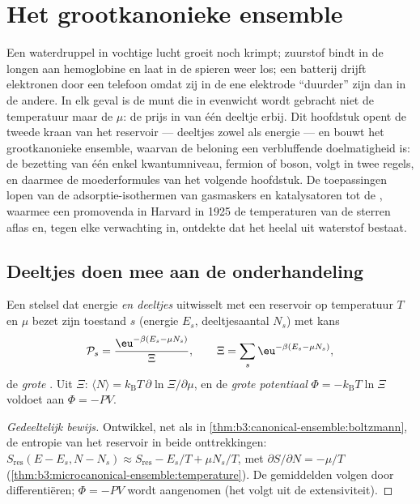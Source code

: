 \chapter{Het grootkanonieke ensemble}\label{ch:b3:grand-canonical}

Een waterdruppel in vochtige lucht groeit noch krimpt; zuurstof bindt in
de longen aan hemoglobine en laat in de spieren weer los; een batterij
drijft elektronen door een telefoon omdat zij in de ene elektrode
``duurder'' zijn dan in de andere. In elk geval is de munt die in
evenwicht wordt gebracht niet de temperatuur maar de \emph{} $\mu$: de prijs in  van één deeltje erbij. Dit
hoofdstuk opent de tweede kraan van het reservoir --- deeltjes zowel als
energie --- en bouwt het grootkanonieke ensemble, waarvan de beloning een
verbluffende doelmatigheid is: de bezetting van één enkel kwantumniveau,
fermion of boson, volgt in twee regels, en daarmee de moederformules van
het volgende hoofdstuk. De toepassingen lopen van de
adsorptie-isothermen van gasmaskers en katalysatoren tot de , waarmee een promovenda in Harvard in 1925 de temperaturen van
de sterren aflas en, tegen elke verwachting in, ontdekte dat het heelal
uit waterstof bestaat.

\section{Deeltjes doen mee aan de onderhandeling}

\begin{theorem}\label{thm:b3:grand-canonical:distribution}
Een stelsel dat energie \emph{en deeltjes} uitwisselt met een reservoir op
temperatuur $T$ en  $\mu$ bezet zijn toestand $s$
(energie $E_s$, deeltjesaantal $N_s$) met kans
\[
\mathcal P_s = \frac{\eu^{-\beta(E_s - \mu N_s)}}{\Xi} , \qquad
\Xi = \sum_s\eu^{-\beta(E_s - \mu N_s)} ,
\]
de \emph{grote }. Uit $\Xi$: $\langle N\rangle
= k_{\text{B}}T\,\partial\ln\Xi/\partial\mu$, en de \emph{grote potentiaal}
$\Phi = -k_{\text{B}}T\ln\Xi$ voldoet aan $\Phi = -PV$.
\end{theorem}

\begin{proof}[Gedeeltelijk bewijs]
Ontwikkel, net als in \cref{thm:b3:canonical-ensemble:boltzmann}, de
entropie van het reservoir in beide onttrekkingen:
$S_{\text{res}}(E - E_s, N - N_s) \approx S_{\text{res}} - E_s/T +
\mu N_s/T$, met $\partial S/\partial N = -\mu/T$
(\cref{thm:b3:microcanonical-ensemble:temperature}). De gemiddelden volgen
door differentiëren; $\Phi = -PV$ wordt aangenomen (het volgt uit de
extensiviteit).
\end{proof}

